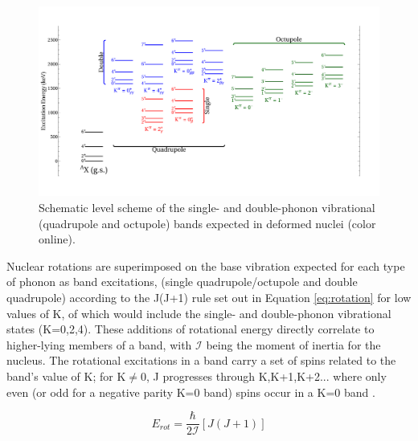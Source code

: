 \begin{figure}[h!] 
\begin{center}
\includegraphics[width=\textwidth]{figures/phonon_deformed.pdf}
\caption{Schematic level scheme of the single- and double-phonon vibrational (quadrupole and octupole) bands expected in deformed nuclei (color online).}
\label{fig:phonon_def}
\end{center}
\end{figure}

Nuclear rotations are superimposed on the base vibration expected for each type of phonon as band excitations, (single quadrupole/octupole and double quadrupole) according to the J(J+1) rule set out in Equation \ref{eq:rotation} for low values of K, of which would include the single- and double-phonon vibrational states (K=0,2,4). These additions of rotational energy directly correlate to higher-lying members of a band, with $\mathcal{I}$ being the moment of inertia for the nucleus. The rotational excitations in a band carry a set of spins related to the band's value of K; for K$\neq$0, J progresses through K,K+1,K+2... where only even (or odd for a negative parity K=0 band) spins occur in a K=0 band \cite{Greiner_Maruhn_text}.

\begin{equation}\label{eq:rotation}
E_{rot}=\frac{\hbar}{2\mathcal{I}}[J(J+1)] %
\end{equation}

